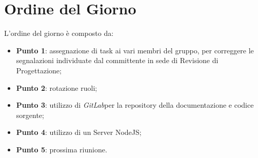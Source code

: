 \section{Ordine del Giorno}
L'ordine del giorno è composto da: 
\begin{itemize}
	\item \textbf{Punto 1}: assegnazione di task ai vari membri del gruppo, per correggere le
	segnalazioni individuate dal committente in sede di Revisione di Progettazione;
	\item \textbf{Punto 2}: rotazione ruoli; 
	\item \textbf{Punto 3}: utilizzo di \textit{GitLab}\glossario per la repository della documentazione e codice sorgente; 
	\item \textbf{Punto 4}: utilizzo di un Server NodeJS;  
	\item \textbf{Punto 5}: prossima riunione.
\end{itemize}